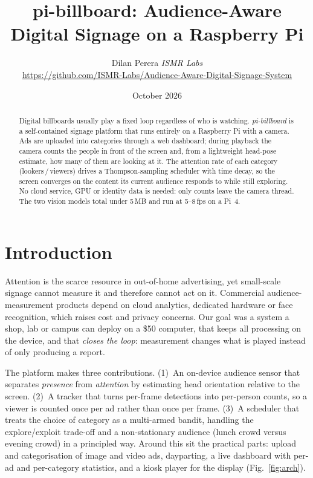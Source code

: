 \documentclass[10pt,a4paper]{article}
\title{\vspace{-16pt}\Large\textbf{pi-billboard: Audience-Aware Digital Signage on a Raspberry Pi}\vspace{-4pt}}
\author{\normalsize Dilan Perera \quad\textit{ISMR Labs}\\[-2pt]\small\url{https://github.com/ISMR-Labs/Audience-Aware-Digital-Signage-System}}
\date{\vspace{-8pt}\small October 2026\vspace{-14pt}}
\begin{document}
\maketitle\thispagestyle{empty}

\begin{abstract}
\noindent
Digital billboards usually play a fixed loop regardless of who is watching. \emph{pi-billboard} is a
self-contained signage platform that runs entirely on a Raspberry Pi with a camera. Ads are uploaded into
categories through a web dashboard; during playback the camera counts the people in front of the screen and,
from a lightweight head-pose estimate, how many of them are looking at it. The attention rate of each category
(lookers\,/\,viewers) drives a Thompson-sampling scheduler with time decay, so the screen converges on the
content its current audience responds to while still exploring. No cloud service, GPU or identity data is
needed: only counts leave the camera thread. The two vision models total under 5\,MB and run at 5--8\,fps on a Pi~4.
\end{abstract}
\vspace{-4pt}

\section{Introduction}
Attention is the scarce resource in out-of-home advertising, yet small-scale signage cannot measure it and
therefore cannot act on it. Commercial audience-measurement products depend on cloud analytics, dedicated
hardware or face recognition, which raises cost and privacy concerns. Our goal was a system a shop, lab or
campus can deploy on a \$50 computer, that keeps all processing on the device, and that \emph{closes the loop}:
measurement changes what is played instead of only producing a report.

The platform makes three contributions. (1)~An on-device audience sensor that separates \emph{presence} from
\emph{attention} by estimating head orientation relative to the screen. (2)~A tracker that turns per-frame
detections into per-person counts, so a viewer is counted once per ad rather than once per frame. (3)~A
scheduler that treats the choice of category as a multi-armed bandit, handling the explore/exploit trade-off
and a non-stationary audience (lunch crowd versus evening crowd) in a principled way. Around this sit the
practical parts: upload and categorisation of image and video ads, dayparting, a live dashboard with per-ad and
per-category statistics, and a kiosk player for the display (Fig.~\ref{fig:arch}).
\end{document}
